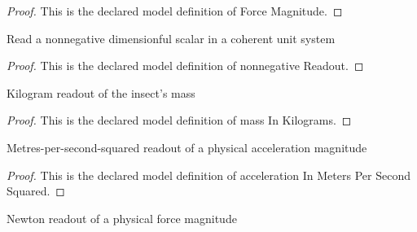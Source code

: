 \begin{proof}
  This is the declared model definition of Force Magnitude.
\end{proof}
\begin{definition}
  \label{def:physics:phyx-mini-0758:phyxminiproblems-problemphyxmini0758-nonnegativereadout}
  Read a nonnegative dimensionful scalar in a coherent unit system
\end{definition}
\begin{proof}
  This is the declared model definition of nonnegative Readout.
\end{proof}
\begin{definition}
  \label{def:physics:phyx-mini-0758:phyxminiproblems-problemphyxmini0758-massinkilograms}
  Kilogram readout of the insect's mass
\end{definition}
\begin{proof}
  This is the declared model definition of mass In Kilograms.
\end{proof}
\begin{definition}
  \label{def:physics:phyx-mini-0758:phyxminiproblems-problemphyxmini0758-accelerationinmeterspersecondsquared}
  Metres-per-second-squared readout of a physical acceleration magnitude
\end{definition}
\begin{proof}
  This is the declared model definition of acceleration In Meters Per Second Squared.
\end{proof}
\begin{definition}
  \label{def:physics:phyx-mini-0758:phyxminiproblems-problemphyxmini0758-forceinnewtons}
  Newton readout of a physical force magnitude
\end{definition}
